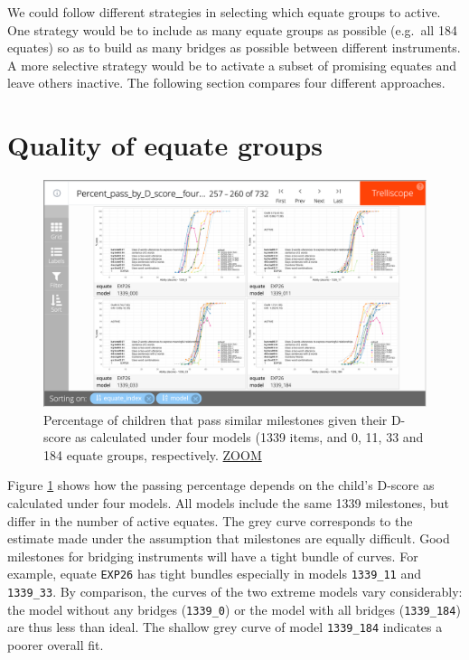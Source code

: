 \documentclass[
]{book}
\begin{document}
We could follow different strategies in selecting which equate groups to active. One strategy would be to include as many equate groups as possible (e.g.~all 184 equates) so as to build as many bridges as possible between different instruments. A more selective strategy would be to activate a subset of promising equates and leave others inactive. The following section compares four different approaches.

\hypertarget{sec:equatequality}{%
\section{Quality of equate groups}\label{sec:equatequality}}

\begin{figure}

{\centering \includegraphics[width=1\linewidth]{fig/fig_5.4} 

}

\caption{Percentage of children that pass similar milestones given their D-score as calculated under four models (1339 items, and 0, 11, 33 and 184 equate groups, respectively. \href{https://d-score.org/dbook-apps/p-d-equate-1339/\#display=Percent_pass_by_D_score__four_models\&nrow=2\&ncol=2\&arr=row\&pg=65\&labels=equate,model\&sort=equate_index;asc,model;asc\&filter=\&sidebar=\&fv=}{ZOOM}}\label{fig:p-d-equate-1339}
\end{figure}



Figure \ref{fig:p-d-equate-1339} shows how the passing percentage depends on the child's D-score as calculated under four models. All models include the same 1339 milestones, but differ in the number of active equates. The grey curve corresponds to the estimate made under the assumption that milestones are equally difficult. Good milestones for bridging instruments will have a tight bundle of curves. For example, equate \texttt{EXP26} has tight bundles especially in models \texttt{1339\_11} and \texttt{1339\_33}. By comparison, the curves of the two extreme models vary considerably: the model without any bridges (\texttt{1339\_0}) or the model with all bridges (\texttt{1339\_184}) are thus less than ideal. The shallow grey curve of model \texttt{1339\_184} indicates a poorer overall fit.
\end{document}
